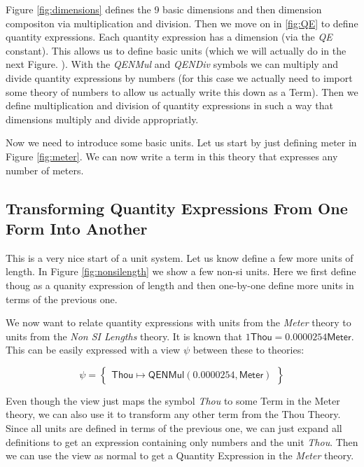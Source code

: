 

Figure \ref{fig:dimensions} defines the 9 basic dimensions and then dimension compositon via multiplication and division. Then we move on in \ref{fig:QE} to define quantity expressions. Each quantity expression has a dimension (via the \textit{QE} constant). This allows us to define basic units (which we will actually do in the next Figure. ). With the \textit{QENMul} and \textit{QENDiv} symbols we can multiply and divide quantity expressions by numbers (for this case we actually need to import some theory of numbers to allow us actually write this down as a Term). Then we define multiplication and division of quantity expressions in such a way that dimensions multiply and divide appropriatly.

Now we need to introduce some basic units. Let us start by just defining meter in Figure \ref{fig:meter}. We can now write a term in this theory that expresses any number of meters.



\subsection{Transforming Quantity Expressions From One Form Into Another}
\label{sec:qeconv}

This is a very nice start of a unit system. Let us know define a few more units of length. In Figure \ref{fig:nonsilength} we show a few non-si units. Here we first define thoug as a quanity expression of length and then one-by-one define more units in terms of the previous one.


We now want to relate quantity expressions with units from the \textit{Meter} theory to units from the \textit{Non SI Lengths} theory. It is known that $1 \mathsf{Thou} = 0.0000254 \mathsf{Meter}$. This can be easily expressed with a view $\psi$ between these to theories:

\[
\psi = \left\{\begin{array}{l}
  \mathsf{Thou} \mapsto \mathsf{QENMul} \left( 0.0000254, \mathsf{Meter} \right)
\end{array}\right\}
\]

Even though the view just maps the symbol \textit{Thou} to some Term in the Meter theory, we can also use it to transform any other term from the Thou Theory. Since all units are defined in terms of the previous one, we can just expand all definitions to get an expression containing only numbers and the unit \textit{Thou}. Then we can use the view as normal to get a Quantity Expression in the \textit{Meter} theory.

